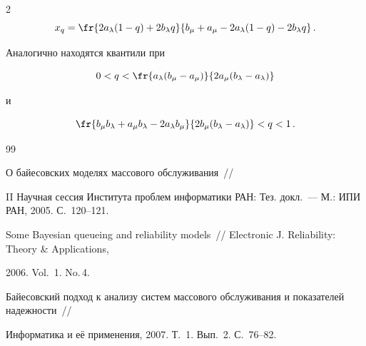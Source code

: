 \begin{multicols}{2}
$$


x_q=\fr{2a_\lambda(1-q)+2b_\lambda q}{b_\mu+a_\mu-2a_\lambda(1-q)-2b_\lambda q}\,.


$$


Аналогично находятся квантили при


$$


0<q<\fr{a_\lambda(b_\mu-a_\mu)}{2a_\mu(b_\lambda-a_\lambda)}


$$


и


$$


\fr{b_\mu b_\lambda+a_\mu b_\lambda-2a_\lambda b_\mu}{2b_\mu(b_\lambda-a_\lambda)}<q<1\,.


$$





{\small\frenchspacing


{%




\begin{thebibliography}{99}









О байесовских моделях массового обслуживания~// 


II Научная сессия Института проблем информатики РАН: Тез. докл.~--- М.: ИПИ РАН, 2005. С.~120--121.









Some Bayesian queueing and reliability models~// Electronic J. Reliability: Theory \& Applications, 


2006. Vol.~1. No.\,4.









Байесовский подход к анализу систем массового обслуживания и показателей надежности~// 


Информатика и её применения, 2007. Т.~1. Вып.~2. С.~76--82.








\end{thebibliography}}}
\end{multicols}
